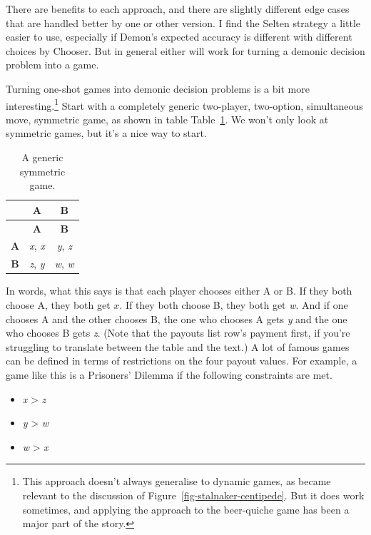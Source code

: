 \documentclass[
  12pt,
  letterpaper,
  DIV=11,
  numbers=noendperiod]{scrreprt}
\providecommand{\tightlist}{%
  \setlength{\itemsep}{0pt}\setlength{\parskip}{0pt}}\usepackage{longtable,booktabs,array}
\begin{document}
There are benefits to each approach, and there are slightly different
edge cases that are handled better by one or other version. I find the
Selten strategy a little easier to use, especially if Demon's expected
accuracy is different with different choices by Chooser. But in general
either will work for turning a demonic decision problem into a game.

Turning one-shot games into demonic decision problems is a bit more
interesting.\footnote{This approach doesn't always generalise to dynamic
  games, as became relevant to the discussion of
  Figure~\ref{fig-stalnaker-centipede}. But it does work sometimes, and
  applying the approach to the beer-quiche game has been a major part of
  the story.} Start with a completely generic two-player, two-option,
simultaneous move, symmetric game, as shown in table
Table~\ref{tbl-basic-sym-game}. We won't only look at symmetric games,
but it's a nice way to start.

\begin{longtable}[]{@{}ccc@{}}
\caption{A generic symmetric
game.}\label{tbl-basic-sym-game}\tabularnewline
\toprule\noalign{}
& \textbf{A} & \textbf{B} \\
\midrule\noalign{}
\endfirsthead
\toprule\noalign{}
& \textbf{A} & \textbf{B} \\
\midrule\noalign{}
\endhead
\bottomrule\noalign{}
\endlastfoot
\textbf{A} & \emph{x}, \emph{x} & \emph{y}, \emph{z} \\
\textbf{B} & \emph{z}, \emph{y} & \emph{w}, \emph{w} \\
\end{longtable}

In words, what this says is that each player chooses either A or B. If
they both choose A, they both get \(x\). If they both choose B, they
both get \emph{w}. And if one chooses A and the other chooses B, the one
who chooses A gets \emph{y} and the one who chooses B gets \emph{z}.
(Note that the payouts list row's payment first, if you're struggling to
translate between the table and the text.) A lot of famous games can be
defined in terms of restrictions on the four payout values. For example,
a game like this is a Prisoners' Dilemma if the following constraints
are met.

\begin{itemize}
\tightlist
\item
  \emph{x} \textgreater{} \emph{z}
\item
  \emph{y} \textgreater{} \emph{w}
\item
  \emph{w} \textgreater{} \emph{x}
\end{itemize}
\end{document}
